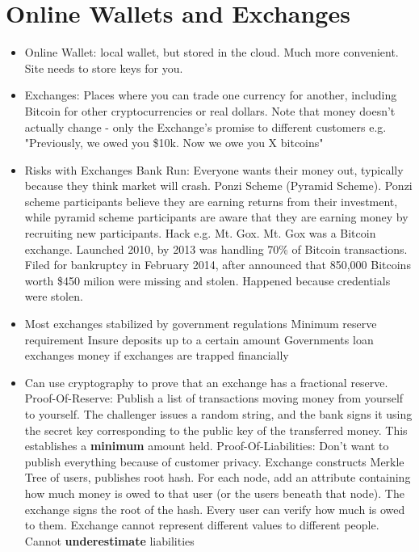 \documentclass{article}
\begin{document}
\section{Online Wallets and Exchanges}
\begin{itemize}
\item Online Wallet: local wallet, but stored in the cloud. Much more convenient. Site needs to store keys for you.
\item Exchanges: Places where you can trade one currency for another, including Bitcoin for other cryptocurrencies or real dollars.
\subitem Note that money doesn't actually change - only the Exchange's promise to different customers e.g. "Previously, we owed you \$10k. Now we owe you X bitcoins"
\item Risks with Exchanges
\subitem Bank Run: Everyone wants their money out, typically because they think market will crash.
\subitem Ponzi Scheme (Pyramid Scheme). Ponzi scheme participants believe they are earning returns from their investment, while pyramid scheme participants are aware that they are earning money by recruiting new participants.
\subitem Hack e.g. Mt. Gox. Mt. Gox was a Bitcoin exchange. Launched 2010, by 2013 was handling 70\% of Bitcoin transactions. Filed for bankruptcy in February 2014, after announced that 850,000 Bitcoins worth \$450 milion were missing and stolen. Happened because credentials were stolen.
\subitem 
\item Most exchanges stabilized by government regulations
\subitem Minimum reserve requirement
\subitem Insure deposits up to a certain amount
\subitem Governments loan exchanges money if exchanges are trapped financially
\item Can use cryptography to prove that an exchange has a fractional reserve.
\subitem Proof-Of-Reserve: Publish a list of transactions moving money from yourself to yourself. The challenger issues a random string, and the bank signs it using the secret key corresponding to the public key of the transferred money. This establishes a \textbf{minimum} amount held.
\subitem Proof-Of-Liabilities: Don't want to publish everything because of customer privacy. Exchange constructs Merkle Tree of users, publishes root hash. For each node, add an attribute containing how much money is owed to that user (or the users beneath that node). The exchange signs the root of the hash. Every user can verify how much is owed to them. Exchange cannot represent different values to different people. Cannot \textbf{underestimate} liabilities
\end{itemize}
\end{document}

